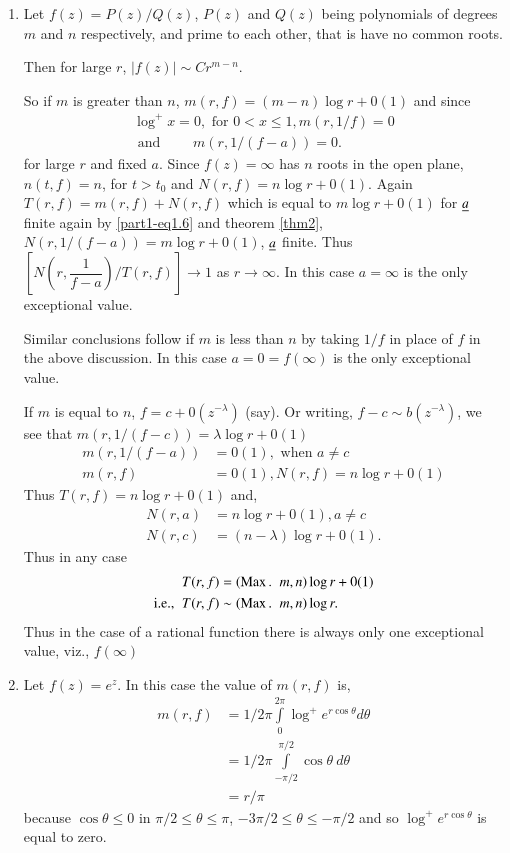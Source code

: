 \begin{enumerate}
\item Let $f(z)=P(z)/Q(z)$, $P(z)$ and $Q(z)$ being polynomials of
  degrees $m$ and $n$ respectively, and prime to each other, that is
  have no common roots.

Then for large $r$, $|f(z)|\sim Cr^{m-n}$.

So if $m$ is greater than $n$, $m(r,f)=(m-n)\log r+0(1)$ and since
\begin{gather*}
\log^{+}x=0, \text{ \ for \ } 0<x\leq 1, m(r,1/f)=0\\
 \text{ \ and \ }\qquad m(r,1/(f-a))=0.\tag{1.6}\label{part1-eq1.6} 
\end{gather*}
for large $r$ and fixed $a$. Since $f(z)=\infty$ has $n$ roots in the
open plane, $n(t,f)=n$, for $t>t_{0}$ and $N(r,f)=n\log r+0(1)$. Again
$T(r,f)=m(r,f)+N(r,f)$ which is equal to $m\log r+0(1)$ for $\underline{a}$
finite again by \eqref{part1-eq1.6} and theorem \ref{thm2},
$N(r,1/(f-a))=m\log r+0(1)$, $\underline{a}$ finite. Thus
$\left[N\left(r,\dfrac{1}{f-a}\right)/T(r,f)\right]\to 1$ as $r\to
\infty$. In this case $a=\infty$ is the only exceptional value.

Similar conclusions follow if $m$ is less than $n$ by taking $1/f$ in
place of $f$ in the above discussion. In this case $a=0=f(\infty)$ is
the only exceptional value.

If $m$ is equal to $n$, $f=c+0(z^{-\lambda})$ (say). Or writing,
$f-c\sim b(z^{-\lambda})$, we see that $m(r,1/(f-c))=\lambda \log
r+0(1)$
\begin{align*}
m(r,1/(f-a)) &= 0(1), \text{ \ when \ } a\neq c\\
m(r,f) &= 0(1), N(r,f)=n\log r+0(1)
\end{align*}
Thus $T(r,f)=n\log r+0(1)$ and, 
\begin{align*}
N(r,a) &= n\log r+0(1), a\neq c\\
N(r,c) &= (n-\lambda)\log r+0(1).
\end{align*}
Thus in any case 
\begin{align*}
T(r,f) &= (\operatorname{Max}. \;\; m,n) \log r+0(1)\\
\text{{i.e.,}\kern.3em\ } T(r,f) &\sim (\operatorname{Max}. \;\; m,n)\log r.
\end{align*}\pageoriginale
Thus in the case of a rational function there is always only one
exceptional value, viz., $f(\infty)$

\item Let $f(z)=e^{z}$. In this case the value of $m(r,f)$ is,
\begin{align*}
m(r,f) &= 1/2\pi\int\limits^{2\pi}_{0}\log^{+}e^{r\cos \theta}d\theta\\
&= 1/2\pi\int\limits^{\pi/2}_{-\pi/2}\cos\theta \ d\theta\\
&= r/\pi
\end{align*}
because $\cos\theta\leq 0$ in $\pi/2\leq \theta\leq \pi$, $-3\pi/2\leq
\theta\leq -\pi/2$ and so $\log^{+}e^{r\cos \theta}$ is equal to zero.
\end{enumerate}

